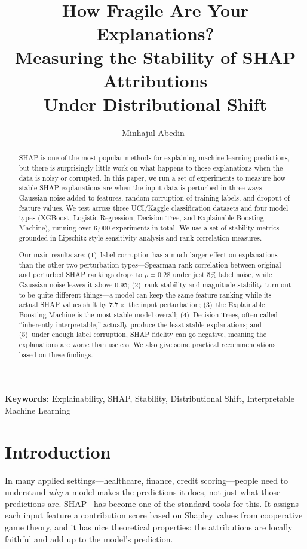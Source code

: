\documentclass[10pt,twocolumn]{article}
\title{%
  \textbf{How Fragile Are Your Explanations?}\\[4pt]
  Measuring the Stability of SHAP Attributions\\
  Under Distributional Shift%
}
\author{Minhajul Abedin~\orcidlink{0009-0006-5654-632X}}
\affil{Department of Applied Mathematics, Noakhali Science and Technology University, Noakhali-3814, Bangladesh \\ \small minhajul0616@student.nstu.edu.bd}
\date{}
\begin{document}
\maketitle

\begin{abstract}
SHAP is one of the most popular methods for explaining machine
learning predictions, but there is surprisingly little work on what
happens to those explanations when the data is noisy or corrupted.
In this paper, we run a set of experiments to measure how stable
SHAP explanations are when the input data is perturbed in three
ways: Gaussian noise added to features, random corruption of
training labels, and dropout of feature values. We test across
three UCI/Kaggle classification datasets and four model types
(XGBoost, Logistic Regression, Decision Tree, and Explainable
Boosting Machine), running over 6{,}000 experiments in total.
We use a set of stability metrics grounded in Lipschitz-style
sensitivity analysis and rank correlation measures.

Our main results are: (1)~label corruption has a much larger effect
on explanations than the other two perturbation types---Spearman
rank correlation between original and perturbed SHAP rankings
drops to $\rho = 0.28$ under just 5\% label noise, while Gaussian
noise leaves it above 0.95; (2)~rank stability and magnitude
stability turn out to be quite different things---a model can keep
the same feature ranking while its actual SHAP values shift by
$7.7\times$ the input perturbation; (3)~the Explainable Boosting
Machine is the most stable model overall; (4)~Decision Trees,
often called ``inherently interpretable,'' actually produce the
least stable explanations; and (5)~under enough label corruption,
SHAP fidelity can go negative, meaning the explanations are worse
than useless. We also give some practical recommendations based
on these findings.
\end{abstract}

\textbf{Keywords:} Explainability, SHAP, Stability, Distributional
Shift, Interpretable Machine Learning

\section{Introduction}\label{sec:intro}

In many applied settings---healthcare, finance, credit
scoring---people need to understand \emph{why} a model makes the
predictions it does, not just what those predictions are.
SHAP~\cite{lundberg2017unified} has become one of the standard tools
for this. It assigns each input feature a contribution score based
on Shapley values from cooperative game theory, and it has nice
theoretical properties: the attributions are locally faithful and
add up to the model's prediction.
\end{document}
